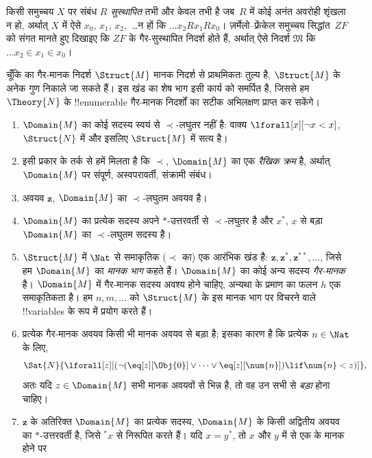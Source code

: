 \documentclass[../../../include/open-logic-section]{subfiles}
\begin{document}
\begin{prob}
किसी समुच्चय $X$ पर संबंध $R$ \emph{सुस्थापित} तभी और केवल तभी है जब~$R$
में कोई अनंत अवरोही शृंखला न हो, अर्थात् $X$ में ऐसे $x_0$, $x_1$,
$x_2$,~\dots न हों कि $\dots x_2Rx_1Rx_0$। ज़र्मेलो--फ़्रेंकेल समुच्चय
सिद्धांत~$ZF$ को संगत मानते हुए दिखाइए कि $ZF$ के गैर-सुस्थापित निदर्श होते
हैं, अर्थात् ऐसे निदर्श $\mathfrak{M}$ कि $\dots x_2 \in x_1 \in x_0$।
\end{prob}

चूँकि  का गैर-मानक निदर्श $\Struct{M}$ मानक निदर्श से
प्राथमिकतः तुल्य है, $\Struct{M}$ के अनेक गुण निकाले जा सकते हैं। इस खंड का
शेष भाग इसी कार्य को समर्पित है, जिससे हम $\Theory{N}$ के !!{enumerable}
गैर-मानक निदर्शों का सटीक अभिलक्षण प्राप्त कर सकेंगे।

\begin{enumerate}
\item $\Domain{M}$ का कोई सदस्य स्वयं से $\prec$-लघुतर नहीं है: वाक्य
  $\lforall[x][\lnot x < x]$, $\Struct{N}$ में और इसलिए $\Struct{M}$ में
  सत्य है।
\item इसी प्रकार के तर्क से हमें मिलता है कि $\prec$, $\Domain{M}$ का एक
  \emph{रैखिक क्रम} है, अर्थात् $\Domain{M}$ पर संपूर्ण, अस्वपरावर्ती,
  संक्रामी संबंध।
\item अवयव $\mathbf{z}$, $\Domain{M}$ का $\prec$-लघुतम अवयव है।
\item $\Domain{M}$ का प्रत्येक सदस्य अपने $*$-उत्तरवर्ती से $\prec$-लघुतर
  है और $x^*$, $x$ से बड़ा $\Domain{M}$ का $\prec$-लघुतम सदस्य है।
\item $\Struct{M}$ में $\Nat$ से समाकृतिक ($\prec$ का) एक आरंभिक खंड है:
  $\mathbf{z}, \mathbf{z}^*, \mathbf{z}^{**}, \dots$, जिसे हम
  $\Domain{M}$ का \emph{मानक भाग} कहते हैं। $\Domain{M}$ का कोई अन्य सदस्य
  \emph{गैर-मानक} है। $\Domain{M}$ में गैर-मानक सदस्य अवश्य होने चाहिए,
  अन्यथा  के प्रमाण का फलन $h$ एक समाकृतिकता है। हम $n,
  m, \dots$ को $\Struct{M}$ के इस मानक भाग पर विचरने वाले !!{variable}s के
  रूप में प्रयोग करते हैं।
\item प्रत्येक गैर-मानक अवयव किसी भी मानक अवयव से बड़ा है; इसका कारण है कि
  प्रत्येक $n \in \Nat$ के लिए,
  \[
  \Sat{N}{\lforall[z][(\lnot(\eq[z][\Obj{0}] \lor
  \dots \lor \eq[z][\num{n}]) \lif \num{n} < z)]},
  \]
  अतः यदि $z \in \Domain{M}$ सभी मानक अवयवों से भिन्न है, तो वह उन सभी से
  \emph{बड़ा} होना चाहिए।
\item $\mathbf{z}$ के अतिरिक्त $\Domain{M}$ का प्रत्येक सदस्य,
  $\Domain{M}$ के किसी अद्वितीय अवयव का $*$-उत्तरवर्ती है, जिसे $^*x$ से
  निरूपित करते हैं। यदि $x = y^*$, तो $x$ और $y$ में से एक के मानक होने पर

\end{enumerate}
\end{document}
